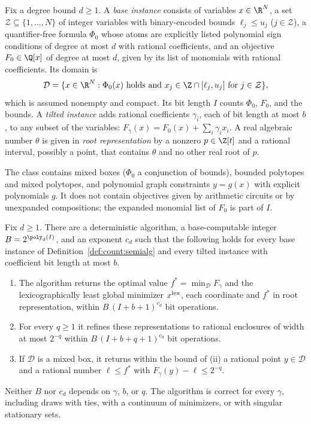 \begin{definition}\label{def:count:semialg}
Fix a degree bound $d\ge1$. A \emph{base instance} consists of variables
$x\in\R^N$, a set $\mathcal Z\subseteq\{1,\dots,N\}$ of integer variables
with binary-encoded bounds $\ell_j\le u_j$ ($j\in\mathcal Z$), a
quantifier-free formula $\Phi_0$ whose atoms are explicitly listed polynomial
sign conditions of degree at most $d$ with rational coefficients, and an
objective $F_0\in\Q[x]$ of degree at most $d$, given by its list of monomials
with rational coefficients. Its domain is
\[
 \mathcal D=\{x\in\R^N:\Phi_0(x)\text{ holds and }
 x_j\in\Z\cap[\ell_j,u_j]\text{ for }j\in\mathcal Z\},
\]
which is assumed nonempty and compact. Its bit length $I$ counts $\Phi_0$,
$F_0$, and the bounds. A \emph{tilted instance} adds rational coefficients
$\gamma_i$, each of bit length at most $b$, to any subset of the variables:
$F_\gamma(x)=F_0(x)+\sum_i\gamma_ix_i$. A real algebraic number $\theta$ is
given in \emph{root representation} by a nonzero $p\in\Z[t]$ and a rational
interval, possibly a point, that contains $\theta$ and no other real root of
$p$.
\end{definition}

The class contains mixed boxes ($\Phi_0$ a conjunction of bounds), bounded
polytopes and mixed polytopes, and polynomial graph constraints $y=g(x)$
with explicit polynomials $g$. It does not contain objectives given by
arithmetic circuits or by unexpanded compositions; the expanded monomial
list of $F_0$ is part of $I$.

\begin{theorem}\label{thm:count:fallback}
Fix $d\ge1$. There are a deterministic algorithm, a base-computable integer
$B=2^{\poly_d(I)}$, and an exponent $c_d$ such that the following holds for
every base instance of Definition~\ref{def:count:semialg} and every tilted
instance with coefficient bit length at most $b$.
\begin{enumerate}[label=(\roman*)]
\item The algorithm returns the optimal value $f^*=\min_{\mathcal D}F_\gamma$
 and the lexicographically least global minimizer $x^{\rm lex}$, each
 coordinate and $f^*$ in root representation, within
 $B\,(I+b+1)^{c_d}$ bit operations.
\item For every $q\ge1$ it refines these representations to rational
 enclosures of width at most $2^{-q}$ within $B\,(I+b+q+1)^{c_d}$ bit
 operations.
\item If $\mathcal D$ is a mixed box, it returns within the bound of (ii) a
 rational point $y\in\mathcal D$ and a rational number $\ell\le f^*$ with
 $F_\gamma(y)-\ell\le2^{-q}$.
\end{enumerate}
Neither $B$ nor $c_d$ depends on $\gamma$, $b$, or $q$. The algorithm is
correct for every $\gamma$, including draws with ties, with a continuum of
minimizers, or with singular stationary sets.
\end{theorem}


